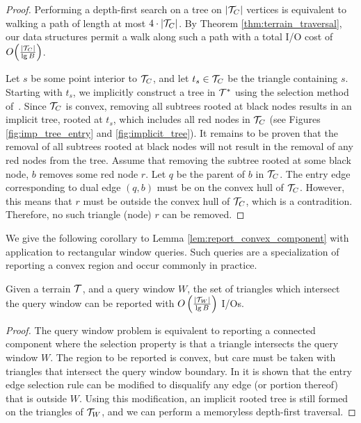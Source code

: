 {  \begin{proof}
  Performing a depth-first search on a tree on $|\mathcal{T}_C|$ vertices is equivalent 
  to walking a path of length at most $4 \cdot |\mathcal{T}_C|$.
  By Theorem \ref{thm:terrain_traversal}, our data structures permit a walk along 
  such a path with a total I/O cost of $O\!\left( \frac{|\mathcal{T}_C|}{\lg{B}} \right)$.

  Let $s$ be some point interior to $\mathcal{T}_C$, and let $t_s \in \mathcal{T}_C$ be
  the triangle containing $s$.
  Starting with $t_s$, we implicitly construct a tree in $\mathcal{T}^*$ using the 
  selection method of~\cite{deberg_et_al_1997}.
  Since $\mathcal{T}_C$ is convex, removing all subtrees rooted at black nodes results 
  in an implicit tree, rooted at $t_s$, which includes all red nodes in $\mathcal{T}_C$
  (see Figures \ref{fig:imp_tree_entry} and \ref{fig:implicit_tree}).
  It remains to be proven that the removal of all subtrees rooted at black nodes
  will not result in the removal of any red nodes from the tree.
  Assume that removing the subtree rooted at some black node, $b$ removes some
  red node $r$. 
  Let $q$ be the parent of $b$ in $\mathcal{T}_C$. 
  The entry edge corresponding to dual edge $(q,b)$ must be on the convex
  hull of $\mathcal{T}_C$.
  However, this means that $r$ must be outside the convex hull of $\mathcal{T}_C$, which
  is a contradition. 
  Therefore, no such triangle (node) $r$ can be removed.
  \end{proof}
  
  We give the following corollary to Lemma \ref{lem:report_convex_component}
  with application to rectangular window queries.
  Such queries are a specialization of reporting a convex region 
  and occur commonly in practice.

  \begin{corollary}\label{cor:window_query}
  Given a terrain $\mathcal{T}$, and a query window $W$, the set of 
  triangles which intersect the query window can be 
  reported with $O \left( \frac{|\mathcal{T}_W|}{\lg{B}} \right)$ I/Os. 
  \end{corollary}

  \begin{proof}
  The query window problem is equivalent to reporting 
  a connected component where the selection property is that a triangle 
  intersects the query window $W$. 
  The region to be reported is convex, but care must be taken with 
  triangles that intersect the query window boundary. 
  In \cite{deberg_et_al_1997} it is shown that the entry edge selection 
  rule can be modified to disqualify any edge (or portion thereof) that 
  is outside $W$. 
  Using this modification, an implicit rooted tree is still formed on 
  the triangles of $\mathcal{T}_W$, and we can perform a memoryless 
  depth-first traversal.
  \end{proof}

}
